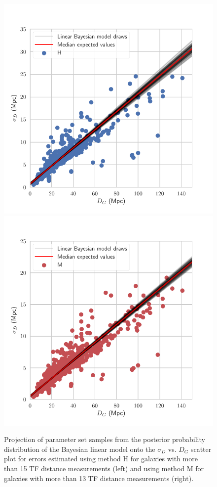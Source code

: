 \documentclass[a4paper,fleqn,usenatbib]{mnras}
\begin{document}
\begin{figure}
	\includegraphics[scale=0.69]{f18drawsl}
	\includegraphics[scale=0.69]{f19drawsl2}
    \caption{Projection of parameter set samples from the posterior probability distribution of the Bayesian linear model onto the $\sigma_D$ vs. $D_G$ scatter plot for errors estimated using method H for galaxies with more than 15 TF distance measurements (left) and using method M for galaxies with more than 13 TF distance measurements (right).}
    \label{fig:drawsl}
\end{figure}
\end{document}
